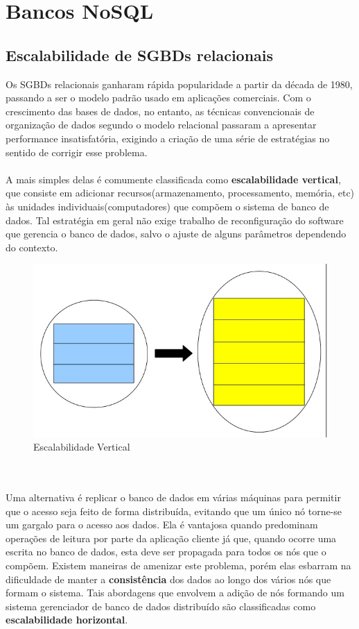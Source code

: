 \section{Bancos NoSQL}
\subsection{Escalabilidade de SGBDs relacionais}
	Os SGBDs relacionais ganharam rápida popularidade a partir da década de 1980, passando a ser o modelo padrão usado em aplicações comerciais. Com o crescimento das bases de dados, no entanto, as técnicas convencionais de organização de dados segundo o modelo relacional passaram a apresentar performance insatisfatória, exigindo a criação de uma série de estratégias no sentido de corrigir esse problema. \\\\
	A mais simples delas é comumente classificada como \textbf{escalabilidade vertical}, que consiste em adicionar recursos(armazenamento, processamento, memória, etc) às unidades individuais(computadores) que compõem o sistema de banco de dados. Tal estratégia em geral não exige trabalho de reconfiguração do software que gerencia o banco de dados, salvo o ajuste de alguns parâmetros dependendo do contexto.
\begin{figure}[h]
	\centering
    \includegraphics[scale=0.30]{figuras/vert_scaling.jpg}
    \caption{Escalabilidade Vertical}
\end{figure}
\\\\
	Uma alternativa é replicar o banco de dados em várias máquinas para permitir que o acesso seja feito de forma distribuída, evitando que um único nó torne-se um gargalo para o acesso aos dados. Ela é vantajosa quando predominam operações de leitura por parte da aplicação cliente já que, quando ocorre uma escrita no banco de dados, esta deve ser propagada para todos os nós que o compõem. Existem maneiras de amenizar este problema, porém elas esbarram na dificuldade de manter a \textbf{consistência} dos dados ao longo dos vários nós que formam o sistema. Tais abordagens que envolvem a adição de nós formando um sistema gerenciador de banco de dados distribuído são classificadas como \textbf{escalabilidade horizontal}.
